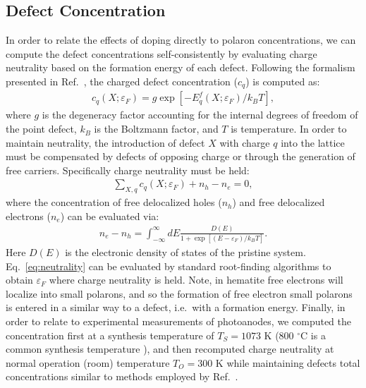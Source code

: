 \subsection{Defect Concentration}
In order to relate the effects of doping directly to polaron concentrations, we can compute the defect concentrations self-consistently by evaluating charge neutrality based on the formation energy of each defect. Following the formalism presented in Ref.~\cite{freysoldt2014first}, the charged defect concentration ($c_q$) is computed as:
\begin{align}
    c_q(X; \varepsilon_F) = g \exp [- E^f_q(X; \varepsilon_F) / k_B T],
\end{align}
where $g$ is the degeneracy factor accounting for the internal degrees of freedom of the point defect, $k_B$ is the Boltzmann factor, and $T$ is temperature. In order to maintain neutrality, the introduction of defect $X$ with charge $q$ into the lattice must be compensated by defects of opposing charge or through the generation of free carriers. Specifically charge neutrality must be held:
\begin{align}
    \sum_{X,q} c_q(X; \varepsilon_F) + n_h - n_e = 0, \label{eq:neutrality}
\end{align}
where the concentration of free delocalized holes ($n_h$) and free delocalized electrons ($n_e$) can be evaluated via:
\begin{align}
    n_e - n_h = \int_{-\infty}^{\infty} dE \frac{D(E)}{1+\exp[(E-\varepsilon_F)/k_B T]}.
\end{align}
Here $D(E)$ is the electronic density of states of the pristine system. Eq.~\ref{eq:neutrality} can be evaluated by standard root-finding algorithms to obtain $\varepsilon_F$ where charge neutrality is held.
Note, in hematite free electrons will localize into small polarons, and so the formation of free electron small polarons is entered in a similar way to a defect, i.e.\ with a formation energy.
Finally, in order to relate to experimental measurements of  photoanodes, we computed the concentration first at a synthesis temperature of $T_S=1073$ K (800 $^\circ$C is a common synthesis temperature \cite{ling2011sn,tian2020electronic}), and then recomputed charge neutrality at normal operation (room) temperature $T_O=300$ K while maintaining defects total concentrations similar to methods employed by Ref.~\cite{lee2013thermodynamics}.
